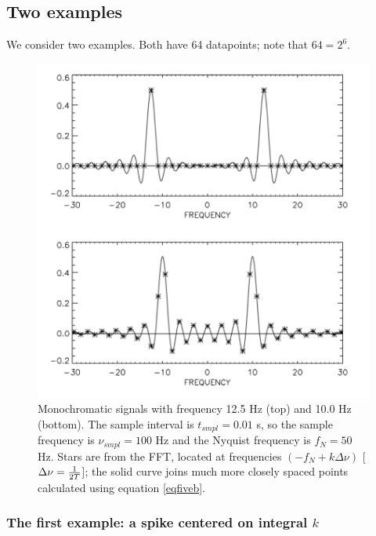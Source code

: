 \documentclass[preprint]{aastex}
\begin{document}
\subsection{Two examples}

	We consider two examples. Both have 64 datapoints; note that $64
= 2^6$.

\begin{figure}[H]
\begin{center}
\leavevmode
 \includegraphics[width=7.0in]{fig3.pdf}
\end{center}
\label{figthree}
\caption{Monochromatic signals with frequency 12.5 Hz (top) and 10.0 Hz
(bottom). The sample interval is $t_{smpl}= 0.01$ s, so the sample
frequency is $\nu_{smpl} = 100$ Hz and the Nyquist frequency is $f_N=50$
Hz. Stars are from the FFT, located at frequencies $(-f_N + k \Delta
\nu)$ [$\Delta \nu= {1 \over 2T}$]; the solid curve joins much more
closely spaced points calculated using equation \ref{eqfiveb}. } 
\end{figure}

\subsubsection{The first example: a spike centered on integral $k$}
\end{document}
